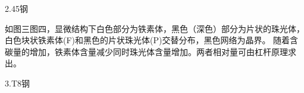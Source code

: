\documentclass[a4paper,utf8]{article}
\begin{document}
\newpage
2.45钢

如图三图四，显微结构下白色部分为铁素体，黑色（深色）部分为片状的珠光体，白色块状铁素体(F)和黑色的片状珠光体(P)交替分布，黑色网络为晶界。
随着含碳量的增加，铁素体含量减少同时珠光体含量增加。两者相对量可由杠杆原理求出。
\begin{figure}[!ht]
    \begin{floatrow}
    \end{floatrow}

\end{figure}

3.T8钢
\end{document}
